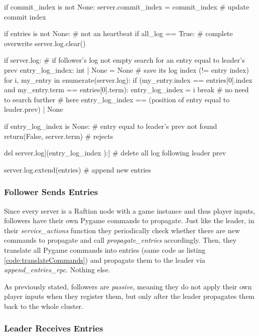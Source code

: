 \begin{python}[label={code:searchFollowerLog}, caption={Follower search in its own log for an entry equal to leader's prev}]
if commit_index is not None:                    
        server.commit_index = commit_index  # update commit index 

if entries is not None:     # not an heartbeat
    if all_log == True:     # complete overwrite
        server.log.clear()

    if server.log:  # if follower's log not empty search for an entry equal to leader's prev
        entry_log_index: int | None = None              # save its log index (!= entry index)
        for i, my_entry in enumerate(server.log):
            if (my_entry.index == entries[0].index 
                and my_entry.term == entries[0].term):
                entry_log_index = i
                break # no need to search further
        # here entry_log_index == (position of entry equal to leader.prev) | None

        if entry_log_index is None:         # entry equal to leader's prev not found
            return(False, server.term)      # rejects

        del server.log[(entry_log_index ):] # delete all log following leader prev 

    server.log.extend(entries) # append new entries
\end{python}

\subsubsection{Follower Sends Entries}

Since every server is a Raftian node with a game instance and thus player inputs, followers have their own Pygame commands to propagate. Just like the leader, in their \textit{service\_actions} function they periodically check whether there are new commands to propagate and call \textit{propagate\_entries} accordingly. Then, they translate all Pygame commands into entries (same code as listing \ref{code:translateCommands}) and propagate them to the leader via \textit{append\_entries\_rpc}. Nothing else. 

As previously stated, followers are \textit{passive}, meaning they do not apply their own player inputs when they register them, but only after the leader propagates them back to the whole cluster.

\subsubsection{Leader Receives Entries}

